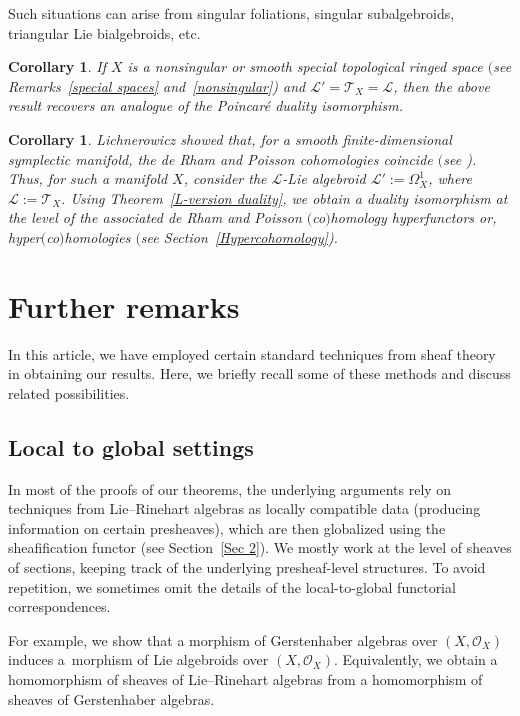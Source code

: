 \documentclass[pdftex]{sigma}
\numberwithin{equation}{section}
\newtheorem{Cor}[Thm]{Corollary}
\theoremstyle{definition}
\begin{document}
Such situations can arise from singular foliations, singular subalgebroids, triangular Lie bialgebroids, etc.
\begin{Cor}
If $X$ is a nonsingular or smooth special topological ringed space $($see Remarks~{\rm \ref{special spaces}} and~{\rm \ref{nonsingular})} and $\mathcal{L}' = \mathcal{T}_X = \mathcal{L}$, then the above result recovers an analogue of the Poincar\'e duality isomorphism.
\end{Cor}

\begin{Cor}Lichnerowicz showed that, for a smooth finite-dimensional symplectic manifold, the de Rham and Poisson cohomologies coincide $($see {\rm \cite{JH})}. Thus, for such a manifold $X$, consider the $\mathcal{L}$-Lie algebroid $\mathcal{L}':=\Omega^1_X$, where $\mathcal{L}:=\mathcal{T}_X$. Using Theorem~{\rm \ref{L-version duality}}, we obtain a duality isomorphism at the level of the associated de Rham and Poisson $($co$)$homology hyperfunctors or, hyper$($co$)$homologies $($see Section~{\rm \ref{Hypercohomology})}.
\end{Cor}

\section{Further remarks}
In this article, we have employed certain standard techniques from sheaf theory in obtaining our results.
Here, we briefly recall some of these methods and discuss related possibilities.

\subsection{Local to global settings}

In most of the proofs of our theorems, the underlying arguments rely on techniques from Lie--Rinehart algebras as locally compatible data (producing information on certain presheaves), which are then globalized using the sheafification functor (see Section~\ref{Sec 2}). We mostly work at the level of sheaves of sections, keeping track of the underlying presheaf-level structures. To avoid repetition, we sometimes omit the details of the local-to-global functorial correspondences.

For example, we show that a morphism of Gerstenhaber algebras over $(X,\mathcal{O}_X)$ induces a~morphism of Lie algebroids over $(X,\mathcal{O}_X)$. Equivalently, we obtain a homomorphism of sheaves of Lie--Rinehart algebras from a homomorphism of sheaves of Gerstenhaber algebras.
\end{document}

